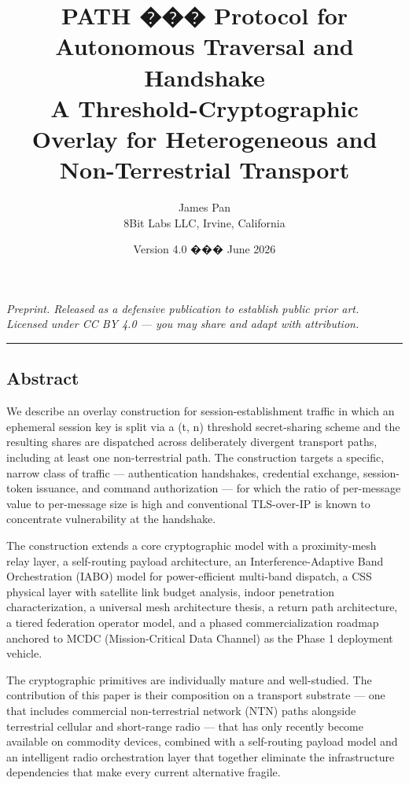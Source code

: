 \documentclass[
  11pt,
]{article}
\title{PATH ��� Protocol for Autonomous Traversal and Handshake \\ {\large A Threshold-Cryptographic Overlay for Heterogeneous and Non-Terrestrial Transport}}
\author{James Pan \\ \normalsize 8Bit Labs LLC, Irvine, California}
\date{Version 4.0 ��� June 2026}
\begin{document}
\maketitle

{
\hypersetup{linkcolor=}
\setcounter{tocdepth}{3}
\tableofcontents
}
\emph{Preprint. Released as a defensive publication to establish public
prior art. Licensed under CC BY 4.0 --- you may share and adapt with
attribution.}

\begin{center}\rule{0.5\linewidth}{0.5pt}\end{center}

\hypertarget{abstract}{%
\subsection{Abstract}\label{abstract}}

We describe an overlay construction for session-establishment traffic in
which an ephemeral session key is split via a (t, n) threshold
secret-sharing scheme and the resulting shares are dispatched across
deliberately divergent transport paths, including at least one
non-terrestrial path. The construction targets a specific, narrow class
of traffic --- authentication handshakes, credential exchange,
session-token issuance, and command authorization --- for which the
ratio of per-message value to per-message size is high and conventional
TLS-over-IP is known to concentrate vulnerability at the handshake.

The construction extends a core cryptographic model with a
proximity-mesh relay layer, a self-routing payload architecture, an
Interference-Adaptive Band Orchestration (IABO) model for
power-efficient multi-band dispatch, a CSS physical layer with satellite
link budget analysis, indoor penetration characterization, a universal
mesh architecture thesis, a return path architecture, a tiered
federation operator model, and a phased commercialization roadmap
anchored to MCDC (Mission-Critical Data Channel) as the Phase 1
deployment vehicle.

The cryptographic primitives are individually mature and well-studied.
The contribution of this paper is their composition on a transport
substrate --- one that includes commercial non-terrestrial network (NTN)
paths alongside terrestrial cellular and short-range radio --- that has
only recently become available on commodity devices, combined with a
self-routing payload model and an intelligent radio orchestration layer
that together eliminate the infrastructure dependencies that make every
current alternative fragile.
\end{document}
